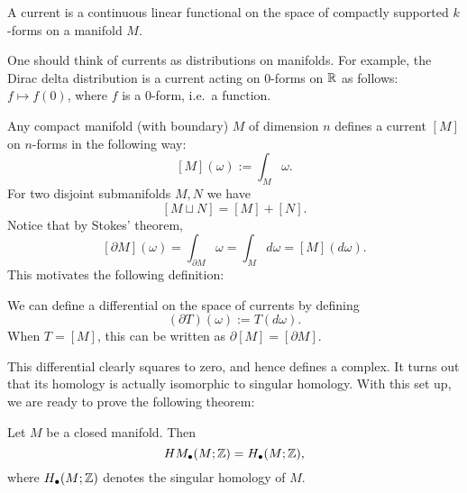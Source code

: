 \begin{definition}[Current]
    A current is a continuous linear functional on the space of compactly supported $k$-forms on a manifold $M$.
\end{definition}
\begin{remark}
    One should think of currents as distributions on manifolds. For example, the Dirac delta distribution is a current acting on $0$-forms on $\R$ as follows: $f \mapsto  f(0)$, where $f$ is a $0$-form, i.e.\ a function.
\end{remark}
\begin{eg}
    Any compact manifold (with boundary) $M$ of dimension $n$ defines a current $[M]$ on $n$-forms in the following way:
    \[
        [M](\omega) := \int_M \omega
    .\] 
    For two disjoint submanifolds $M, N$ we have
    \[
        [M \sqcup N] = [M] + [N]
    .\] 
    Notice that by Stokes' theorem,
    \[
        [\partial M](\omega) = \int_{\partial M} \omega = \int_M d \omega = [M](d \omega).
    \] 
    This motivates the following definition:
\end{eg}
\begin{definition}
    We can define a differential on the space of currents by defining
    \[
        (\partial T) (\omega) := T(d \omega)
    .\] 
    When $T = [M]$, this can be written as $\partial [M] = [\partial M]$. 
\end{definition}
This differential clearly squares to zero, and hence defines a complex.
It turns out that its homology is actually isomorphic to singular homology.
With this set up, we are ready to prove the following theorem:

\begin{theorem}
    Let $M$ be a closed manifold. Then
     \[
         \HMf[\bul]{M; \Z} = H_{\bul}(M; \Z)
    ,\] 
    where $H_{\bul}(M; \Z)$ denotes the singular homology of $M$.
\end{theorem}

